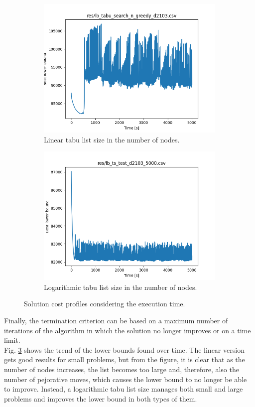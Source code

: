 \begin{figure}[!h]
	\begin{subfigure}{\columnwidth}
		\centering
		\includegraphics[width=.6\columnwidth]{../res/lb_tabu_search_n_greedy_d2103_old.png}
		\caption{Linear tabu list size in the number of nodes.}
		\label{fig:tabu_search_n2}
	\end{subfigure}
	\begin{subfigure}{\columnwidth}
		\centering
		\includegraphics[width=0.6\columnwidth]{../res/lb_ts_test_d2103_5000.png}
		\caption{Logarithmic tabu list size in the number of nodes.}
		\label{fig:tabu_search_r3}
	\end{subfigure}
	\caption{Solution cost profiles considering the execution time.}
	\label{fig:tabu_search_perform_time}
\end{figure}
Finally, the termination criterion can be based on a maximum number of iterations of the algorithm in which the solution no longer improves or on a time limit.\\
Fig. \ref{fig:tabu_search_perform_time} shows the trend of the lower bounds found over time. %
The linear version gets good results for small problems, but from the figure, it is clear that as the number of nodes increases, the list becomes too large and, therefore, also the number of pejorative moves, which causes the lower bound to no longer be able to improve.
Instead, a logarithmic tabu list size manages both small and large problems and improves the lower bound in both types of them.

